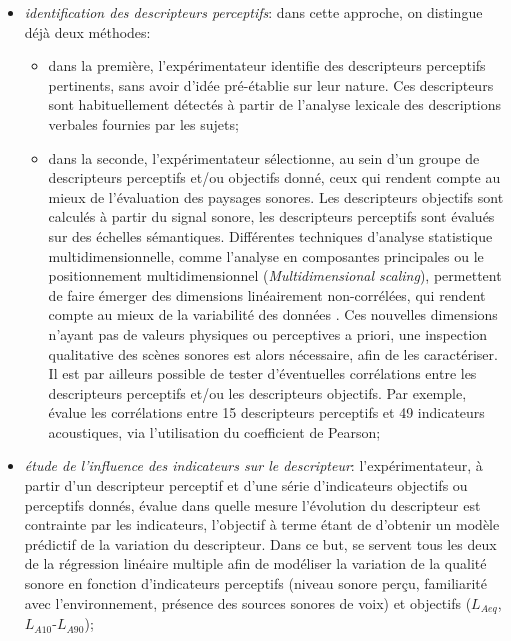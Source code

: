 \begin{itemize}

\item \emph{identification des descripteurs perceptifs}: dans cette approche, on distingue déjà deux méthodes:

\begin{itemize}
\item dans la première, l'expérimentateur identifie des descripteurs perceptifs pertinents, sans avoir d'idée pré-établie sur leur nature. Ces descripteurs sont habituellement détectés à partir de l'analyse lexicale des descriptions verbales fournies par les sujets;

\item dans la seconde, l'expérimentateur sélectionne, au sein d'un groupe de descripteurs perceptifs et/ou objectifs donné, ceux qui rendent compte au mieux de l'évaluation des paysages sonores. Les descripteurs objectifs sont calculés à partir du signal sonore, les descripteurs perceptifs sont évalués sur des échelles sémantiques. Différentes techniques d'analyse statistique multidimensionnelle, comme l'analyse en composantes principales ou le positionnement multidimensionnel (\emph{Multidimensional scaling}), permettent de faire émerger des dimensions linéairement non-corrélées, qui rendent compte au mieux de la variabilité des données \citep{cain2013development,torija2013application}. Ces nouvelles dimensions n'ayant pas de valeurs physiques ou perceptives a priori, une inspection qualitative des scènes sonores est alors nécessaire, afin de les caractériser. Il est par ailleurs possible de tester d'éventuelles corrélations entre les descripteurs perceptifs et/ou les descripteurs objectifs. Par exemple, \citep{torija2013application} évalue les corrélations entre 15 descripteurs perceptifs et 49 indicateurs acoustiques, via l'utilisation du coefficient de Pearson;
\end{itemize}

\item \emph{étude de l'influence des indicateurs sur le descripteur}: l'expérimentateur, à partir d'un descripteur perceptif et d'une série d'indicateurs objectifs ou perceptifs donnés, évalue dans quelle mesure l'évolution du descripteur est contrainte par les indicateurs, l'objectif à terme étant de d'obtenir un modèle prédictif de la variation du descripteur. Dans ce but, \citep{lavandier2006contribution,ricciardi2015sound} se servent tous les deux de la régression linéaire multiple afin de modéliser la variation de la qualité sonore en fonction d'indicateurs perceptifs (niveau sonore perçu, familiarité avec l'environnement, présence des sources sonores de voix) et objectifs ($L_{Aeq}$, $L_{A10}$-$L_{A90}$);


\end{itemize}
